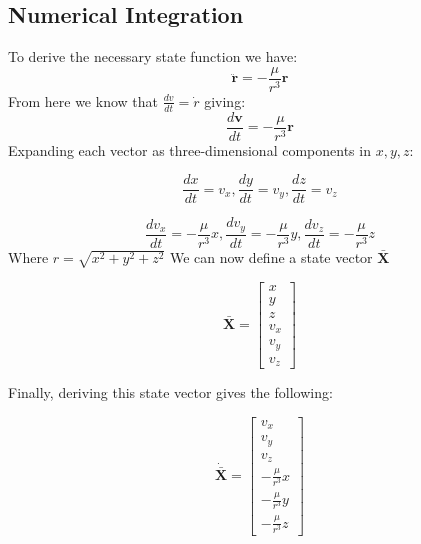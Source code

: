 \documentclass[a4paper, 12pt]{article}  %
\begin{document}
\subsection{Numerical Integration}
To derive the necessary state function we have:
\begin{equation}
    \ddot{\mathbf{r}} = -\frac{\mu}{r^3} \mathbf{r}
\end{equation}
From here we know that $\frac{dv}{dt} = \dot{r}$ giving:
\begin{equation}
    \frac{d\mathbf{v}}{dt} = -\frac{\mu}{r^3} \mathbf{r}
\end{equation}
Expanding each vector as three-dimensional components in $x,y,z$:

\begin{equation}
    \frac{dx}{dt} = v_{x},  \frac{dy}{dt} = v_{y},   \frac{dz}{dt} = v_{z}
\end{equation}


\begin{equation}
    \frac{dv_{x}}{dt} = -\frac{\mu}{r^3} x, \frac{dv_{y}}{dt} = -\frac{\mu}{r^3} y, \frac{dv_{z}}{dt} = -\frac{\mu}{r^3} z
\end{equation}
Where $r = \sqrt{x^{2} + y^{2} + z^{2}}$
\newline
We can now define a state vector $\mathbf{\bar{X}}$


\begin{equation}
    \mathbf{\bar{X}} = 
    \begin{bmatrix}
        x \\
        y \\
        z \\
        v_x \\
        v_y \\
        v_z
        \end{bmatrix}
\end{equation}

Finally, deriving this state vector gives the following:

\begin{equation}
    \mathbf{\dot{\bar{X}}} = 
    \begin{bmatrix}
        v_x \\
        v_y \\
        v_z \\
        -\frac{\mu}{r^3} x \\
        -\frac{\mu}{r^3} y \\
        -\frac{\mu}{r^3} z
        \end{bmatrix}
\end{equation}
\end{document}
